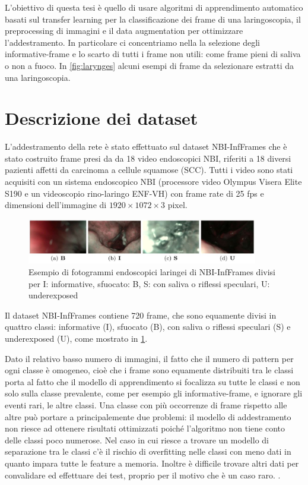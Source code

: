 L'obiettivo di questa tesi è quello di usare algoritmi di apprendimento automatico basati sul transfer learning per la classificazione dei frame di una laringoscopia, il  preprocessing di immagini e il data augmentation per ottimizzare l'addestramento. In particolare ci concentriamo nella la selezione degli informative-frame e lo scarto di tutti i frame non utili: come frame pieni di saliva o non a fuoco. In \cref{fig:larynges} alcuni esempi di frame da selezionare estratti da una laringoscopia.

\section{Descrizione dei dataset}\label{descrizione-dei-dataset}

L'addestramento della rete è stato effettuato  sul dataset
NBI-InfFrames  che
è stato costruito frame presi da da 18 video endoscopici NBI, riferiti a
18 diversi pazienti affetti da carcinoma a cellule squamose
(SCC). Tutti i video sono stati acquisiti con un sistema endoscopico
NBI (processore video Olympus Visera Elite S190 e
un videoscopio rino-laringo ENF-VH) con frame rate di
25 fps e dimensioni dell'immagine di \(1920\times 1072\times 3\) pixel.

\begin{figure}[ht]
    \centering
    \includegraphics[width=0.9\textwidth]{introduzione/Larynge.jpg}
    \caption[Esempio di fotogrammi endoscopici laringei di NBI-InfFrames]{Esempio di fotogrammi endoscopici laringei di NBI-InfFrames divisi per I: informative, sfuocato: B, S: con
    saliva o riflessi speculari,
    U: underexposed}
    \label{fig:larynges-2}
\end{figure}

Il dataset NBI-InfFrames contiene 720 frame, che sono equamente divisi in quattro classi: informative (I), sfuocato (B), con saliva o riflessi speculari (S) e underexposed  (U), come mostrato in \cref{fig:larynges-2}. 

Dato il relativo basso numero di immagini, il fatto che il numero di pattern per ogni classe è omogeneo, cioè che i frame sono equamente distribuiti tra le classi porta al fatto che il modello di apprendimento si focalizza su tutte le classi e non solo sulla classe prevalente, come per esempio gli informative-frame, e ignorare gli eventi rari, le altre classi.
Una classe con più occorrenze di frame rispetto alle altre può portare a principalemente due problemi: il modello di addestramento non riesce ad ottenere risultati ottimizzati  poiché l'algoritmo non tiene conto delle classi poco numerose. Nel caso in cui riesce a trovare un modello di separazione tra le classi c'è il rischio di overfitting nelle classi con meno dati in quanto impara tutte le feature a memoria. Inoltre è difficile trovare altri dati per convalidare ed effettuare dei test, proprio per il motivo che è un caso raro. \cite{chatterjee_deep_2018}.

